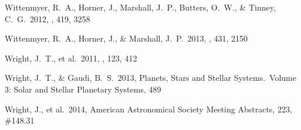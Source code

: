 \begin{thebibliography}
 Wittenmyer, R.~A., 
Horner, J., Marshall, J.~P., Butters, O.~W., 
\& Tinney, C.~G.\ 2012, \mnras, 419, 3258 %

 Wittenmyer, R.~A., 
Horner, J., \& Marshall, J.~P.\ 2013, \mnras, 431, 2150 %

 Wright, J.~T., et al.\ 2011,
  \pasp, 123, 412 %

 Wright, J.~T., \& Gaudi, B.~S.\ 2013,
  Planets, Stars and Stellar Systems.~Volume 3: Solar and Stellar
  Planetary Systems, 489 %

 Wright, J., et al.\ 2014, 
American Astronomical Society Meeting Abstracts, 223, \#148.31

\end{thebibliography}
